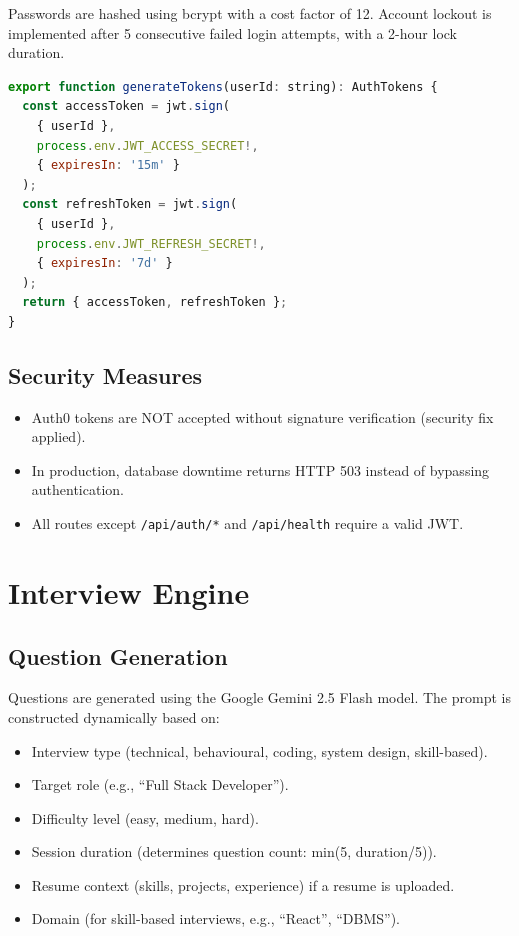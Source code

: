 Passwords are hashed using bcrypt with a cost factor of 12. Account lockout is implemented after 5 consecutive failed login attempts, with a 2-hour lock duration.

\begin{lstlisting}[language=JavaScript, caption={JWT Token Generation}]
export function generateTokens(userId: string): AuthTokens {
  const accessToken = jwt.sign(
    { userId },
    process.env.JWT_ACCESS_SECRET!,
    { expiresIn: '15m' }
  );
  const refreshToken = jwt.sign(
    { userId },
    process.env.JWT_REFRESH_SECRET!,
    { expiresIn: '7d' }
  );
  return { accessToken, refreshToken };
}
\end{lstlisting}

\subsection{Security Measures}

\begin{itemize}
    \item Auth0 tokens are NOT accepted without signature verification (security fix applied).
    \item In production, database downtime returns HTTP 503 instead of bypassing authentication.
    \item All routes except \texttt{/api/auth/*} and \texttt{/api/health} require a valid JWT.
\end{itemize}

\section{Interview Engine}

\subsection{Question Generation}

Questions are generated using the Google Gemini 2.5 Flash model. The prompt is constructed dynamically based on:
\begin{itemize}
    \item Interview type (technical, behavioural, coding, system design, skill-based).
    \item Target role (e.g., ``Full Stack Developer'').
    \item Difficulty level (easy, medium, hard).
    \item Session duration (determines question count: min(5, duration/5)).
    \item Resume context (skills, projects, experience) if a resume is uploaded.
    \item Domain (for skill-based interviews, e.g., ``React'', ``DBMS'').
\end{itemize}

